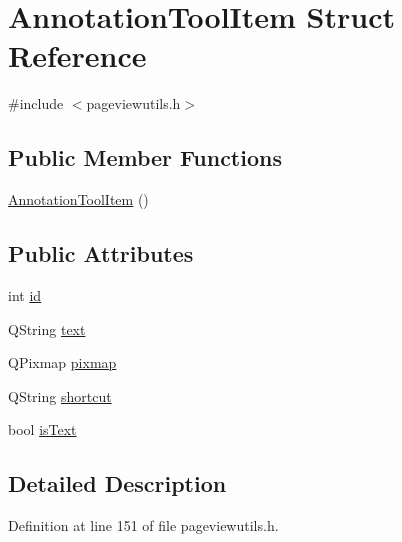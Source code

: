 \hypertarget{structAnnotationToolItem}{\section{Annotation\+Tool\+Item Struct Reference}
\label{structAnnotationToolItem}
}


{\ttfamily \#include $<$pageviewutils.\+h$>$}

\subsection*{Public Member Functions}
\begin{DoxyCompactItemize}
\item 
\hyperlink{structAnnotationToolItem_a3d041f330c157d99941c41c50b1cec90}{Annotation\+Tool\+Item} ()
\end{DoxyCompactItemize}
\subsection*{Public Attributes}
\begin{DoxyCompactItemize}
\item 
int \hyperlink{structAnnotationToolItem_a738162ebc807fdfb9d0a7937c34bab01}{id}
\item 
Q\+String \hyperlink{structAnnotationToolItem_a5a24d93be5ae5fba2c921b205c29b017}{text}
\item 
Q\+Pixmap \hyperlink{structAnnotationToolItem_a329b59ebf0a0064444d34874f41a70cb}{pixmap}
\item 
Q\+String \hyperlink{structAnnotationToolItem_ad9bf3c20abf0ddfc1d1ff826cd3d3da5}{shortcut}
\item 
bool \hyperlink{structAnnotationToolItem_a7627b1e7036d516cd4bd290a9099a549}{is\+Text}
\end{DoxyCompactItemize}


\subsection{Detailed Description}


Definition at line 151 of file pageviewutils.\+h.



